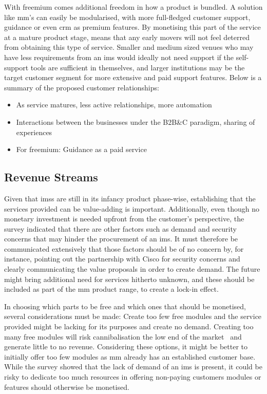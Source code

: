 With freemium comes additional freedom in how a product is bundled. A solution like \gls{mm}'s can easily be modularised, with more full-fledged customer support, guidance or even \gls{crm} as premium features. By monetising this part of the service at a mature product stage, means that any early movers will not feel deterred from obtaining this type of service. Smaller and medium sized venues who may have less requirements from an \gls{ims} would ideally not need support if the self-support tools are sufficient in themselves, and larger institutions may be the target customer segment for more extensive and paid support features. Below is a summary of the proposed customer relationships:

\begin{itemize}
    \item As service matures, less active relationships, more automation
    \item Interactions between the businesses under the B2B\&C paradigm, sharing of experiences
    \item For freemium: Guidance as a paid service
\end{itemize}

\subsection{Revenue Streams}
Given that \glspl{ims} are still in its infancy product phase-wise, establishing that the services provided can be value-adding is important. Additionally, even though no monetary investment is needed upfront from the customer's perspective, the survey indicated that there are other factors such as demand and security concerns that may hinder the procurement of an \gls{ims}. It must therefore be communicated extensively that those factors should be of no concern by, for instance, pointing out the partnership with Cisco for security concerns and clearly communicating the value proposals in order to create demand. The future might bring additional need for services hitherto unknown, and these should be included as part of the \gls{mm} product range, to create a lock-in effect. 


In choosing which parts to be free and which ones that should be monetised, several considerations must be made: Create too few free modules and the service provided might be lacking for its purposes and create no demand. Creating too many free modules will risk cannibalisation the low end of the market~\cite{keller2011strategic} and generate little to no revenue. Considering these options, it might be better to initially offer too few modules as \gls{mm} already has an established customer base. While the survey showed that the lack of demand of an \gls{ims} is present, it could be risky to dedicate too much resources in offering non-paying customers modules or features should otherwise be monetised. 


